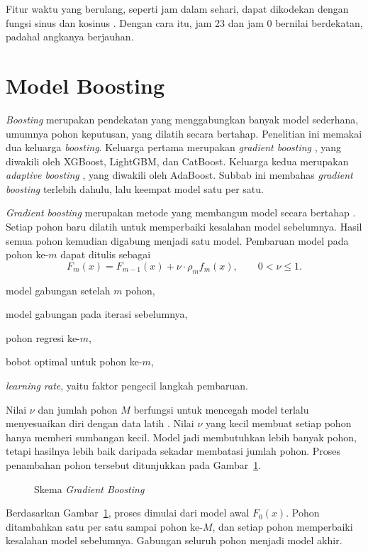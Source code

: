 Fitur waktu yang berulang, seperti jam dalam sehari, dapat dikodekan dengan
fungsi sinus dan kosinus \cite{hyndman2014fpp}. Dengan cara itu, jam 23 dan
jam 0 bernilai berdekatan, padahal angkanya berjauhan.


\section{Model Boosting}
\textit{Boosting} merupakan pendekatan yang menggabungkan banyak model
sederhana, umumnya pohon keputusan, yang dilatih secara bertahap. Penelitian
ini memakai dua keluarga \textit{boosting}. Keluarga pertama merupakan
\textit{gradient boosting} \cite{friedman2001}, yang diwakili oleh XGBoost,
LightGBM, dan CatBoost. Keluarga kedua merupakan \textit{adaptive boosting}
\cite{freund1997}, yang diwakili oleh AdaBoost. Subbab ini membahas
\textit{gradient boosting} terlebih dahulu, lalu keempat model satu per satu.

\textit{Gradient boosting} merupakan metode yang membangun model secara
bertahap \cite{friedman2001}. Setiap pohon baru dilatih untuk memperbaiki
kesalahan model sebelumnya. Hasil semua pohon kemudian digabung menjadi satu
model. Pembaruan model pada pohon ke-$m$ dapat ditulis sebagai
\begin{equation}
  F_m(x) = F_{m-1}(x) + \nu \cdot \rho_m f_m(x), \qquad 0 < \nu \le 1 .
  \label{eq:boosting}
\end{equation}
\begin{keterangan}
  \item[$F_m(x)$] model gabungan setelah $m$ pohon,
  \item[$F_{m-1}(x)$] model gabungan pada iterasi sebelumnya,
  \item[$f_m(x)$] pohon regresi ke-$m$,
  \item[$\rho_m$] bobot optimal untuk pohon ke-$m$,
  \item[$\nu$] \textit{learning rate}, yaitu faktor pengecil langkah
    pembaruan.
\end{keterangan}
Nilai $\nu$ dan jumlah pohon $M$ berfungsi untuk mencegah model terlalu
menyesuaikan diri dengan data latih \cite{friedman2001}. Nilai $\nu$ yang
kecil membuat setiap pohon hanya memberi sumbangan kecil. Model jadi
membutuhkan lebih banyak pohon, tetapi hasilnya lebih baik daripada sekadar
membatasi jumlah pohon. Proses penambahan pohon tersebut ditunjukkan pada Gambar~\ref{fig:gradient-boosting}.

\begin{figure}[!htbp]
  \centering
  \caption[Skema \textit{Gradient Boosting}]{Skema \textit{Gradient Boosting}
    \cite{friedman2001}}
  \label{fig:gradient-boosting}
\end{figure}
Berdasarkan Gambar~\ref{fig:gradient-boosting}, proses dimulai dari model
awal $F_0(x)$. Pohon ditambahkan satu per satu sampai pohon ke-$M$, dan setiap
pohon memperbaiki kesalahan model sebelumnya. Gabungan seluruh pohon menjadi
model akhir.

